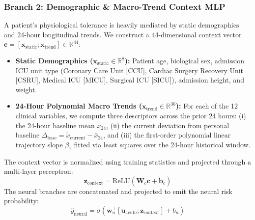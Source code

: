 \documentclass[conference]{IEEEtran}
\begin{document}
\subsubsection{Branch 2: Demographic \& Macro-Trend Context MLP}
A patient's physiological tolerance is heavily mediated by static demographics and 24-hour longitudinal trends. We construct a 44-dimensional context vector $\mathbf{c} = [\mathbf{x}_{\text{static}}; \mathbf{x}_{\text{trend}}] \in \mathbb{R}^{44}$:
\begin{itemize}
    \item \textbf{Static Demographics ($\mathbf{x}_{\text{static}} \in \mathbb{R}^8$):} Patient age, biological sex, admission ICU unit type (Coronary Care Unit [CCU], Cardiac Surgery Recovery Unit [CSRU], Medical ICU [MICU], Surgical ICU [SICU]), admission height, and weight.
    \item \textbf{24-Hour Polynomial Macro Trends ($\mathbf{x}_{\text{trend}} \in \mathbb{R}^{36}$):} For each of the 12 clinical variables, we compute three descriptors across the prior 24 hours: (i) the 24-hour baseline mean $\bar{x}_{24}$, (ii) the current deviation from personal baseline $\Delta_{\text{base}} = \tilde{x}_{\text{current}} - \bar{x}_{24}$, and (iii) the first-order polynomial linear trajectory slope $\beta_1$ fitted via least squares over the 24-hour historical window.
\end{itemize}
The context vector is normalized using training statistics and projected through a multi-layer perceptron:
\begin{equation}
    \mathbf{z}_{\text{context}} = \mathrm{ReLU}(\mathbf{W}_c \tilde{\mathbf{c}} + \mathbf{b}_c)
\end{equation}
The neural branches are concatenated and projected to emit the neural risk probability:
\begin{equation}
    \hat{y}_{\text{neural}} = \sigma\left(\mathbf{w}_n^\top [\mathbf{u}_{\text{acute}}; \mathbf{z}_{\text{context}}] + b_n\right)
\end{equation}
\end{document}
